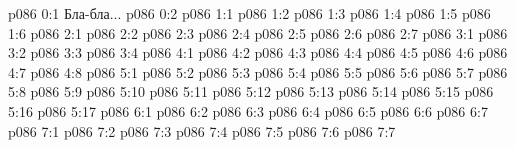 \author{Яркая Вечерняя Звезда}
\vs p086 0:1  Бла-бла...
\vs p086 0:2 
\vs p086 1:1 
\vs p086 1:2 
\vs p086 1:3 
\vs p086 1:4 
\vs p086 1:5 
\vs p086 1:6 
\vs p086 2:1 
\vs p086 2:2 
\vs p086 2:3 \pc 
\vs p086 2:4 \pc 
\vs p086 2:5 
\vs p086 2:6 
\vs p086 2:7 
\vs p086 3:1 
\vs p086 3:2 \pc 
\vs p086 3:3 
\vs p086 3:4 
\vs p086 4:1 
\vs p086 4:2 
\vs p086 4:3 
\vs p086 4:4 
\vs p086 4:5 \pc 
\vs p086 4:6 
\vs p086 4:7 \pc 
\vs p086 4:8 
\vs p086 5:1 
\vs p086 5:2 
\vs p086 5:3 
\vs p086 5:4 
\vs p086 5:5 
\vs p086 5:6 
\vs p086 5:7 
\vs p086 5:8 
\vs p086 5:9 \pc 
\vs p086 5:10 \pc 
\vs p086 5:11 
\vs p086 5:12 
\vs p086 5:13 
\vs p086 5:14 
\vs p086 5:15 
\vs p086 5:16 
\vs p086 5:17 
\vs p086 6:1 
\vs p086 6:2 
\vs p086 6:3 
\vs p086 6:4 
\vs p086 6:5 
\vs p086 6:6 \pc 
\vs p086 6:7 
\vs p086 7:1 
\vs p086 7:2 
\vs p086 7:3 
\vs p086 7:4 
\vs p086 7:5 \pc 
\vs p086 7:6 
\vsetoff
\vs p086 7:7 
\quizlink
